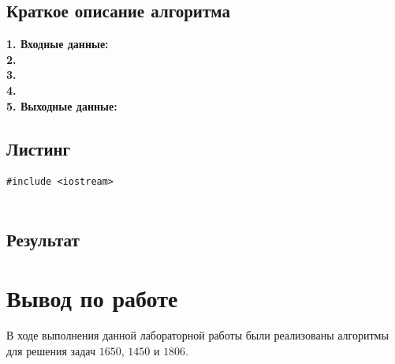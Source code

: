 \documentclass[a5paper, 10pt]{article}
\theoremstyle{definition}
\theoremstyle{plain}
\theoremstyle{remark}
\begin{document}
\subsection{Краткое описание алгоритма}
\textbf{1. Входные данные:} \\
\textbf{2.}  \\
\textbf{3.}  \\
\textbf{4.}  \\
\textbf{5. Выходные данные:}

\subsection{Листинг}

\begin{center}
\begin{lstlisting}[label=some-code,caption={Исходный код для 1806}]
#include <iostream>


\end{lstlisting}
\end{center}

\subsection{Результат}



\newpage
\section{Вывод по работе}
В ходе выполнения данной лабораторной работы были реализованы алгоритмы для решения задач $1650$, $1450$ и $1806$. 
\end{document}
